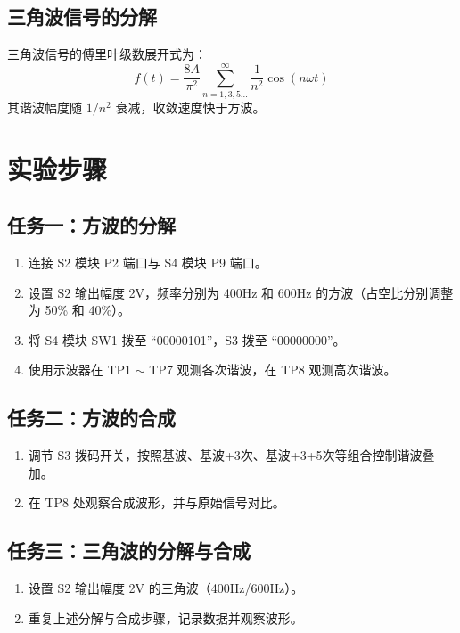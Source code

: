 \documentclass[12pt]{ctexart}
\begin{document}
\subsection{三角波信号的分解}
三角波信号的傅里叶级数展开式为：
\begin{equation}
    f(t) = \frac{8A}{\pi^2} \sum_{n=1,3,5\dots}^{\infty} \frac{1}{n^2} \cos(n\omega t)
\end{equation}
其谐波幅度随 $1/n^2$ 衰减，收敛速度快于方波。
\section{实验步骤}
\subsection{任务一：方波的分解}
\begin{enumerate}
    \item 连接 S2 模块 P2 端口与 S4 模块 P9 端口。
    \item 设置 S2 输出幅度 2V，频率分别为 400Hz 和 600Hz 的方波（占空比分别调整为 50\% 和 40\%）。
    \item 将 S4 模块 SW1 拨至 ``00000101''，S3 拨至 ``00000000''。
    \item 使用示波器在 TP1 $\sim$ TP7 观测各次谐波，在 TP8 观测高次谐波。
\end{enumerate}
\subsection{任务二：方波的合成}
\begin{enumerate}
    \item 调节 S3 拨码开关，按照基波、基波+3次、基波+3+5次等组合控制谐波叠加。
    \item 在 TP8 处观察合成波形，并与原始信号对比。
\end{enumerate}
\subsection{任务三：三角波的分解与合成}
\begin{enumerate}
    \item 设置 S2 输出幅度 2V 的三角波（400Hz/600Hz）。
    \item 重复上述分解与合成步骤，记录数据并观察波形。
\end{enumerate}
\end{document}
